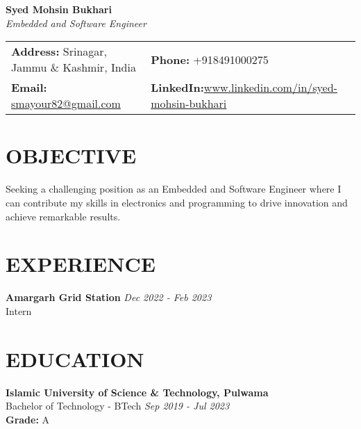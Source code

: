 \documentclass[a4paper,10pt]{article}
\begin{document}
\begin{center}
    \textbf{\Huge Syed Mohsin Bukhari} \\
    \vspace{0.5em}
    \small
    \textit{Embedded and Software Engineer} \\
    \vspace{1em}
    \begin{tabular}{p{10cm}p{6cm}}
        \textbf{Address:} Srinagar, Jammu \& Kashmir, India & \textbf{Phone:} +918491000275 \\
        \textbf{Email:} \url{smayour82@gmail.com} & \textbf{LinkedIn:}\url{www.linkedin.com/in/syed-mohsin-bukhari} \\
    \end{tabular}
\end{center}

\section{OBJECTIVE}
Seeking a challenging position as an Embedded and Software Engineer where I can contribute my skills in electronics and programming to drive innovation and achieve remarkable results.

\section{EXPERIENCE}
\textbf{Amargarh Grid Station} \hfill \textit{Dec 2022 - Feb 2023} \\
Intern

\section{EDUCATION}
\textbf{Islamic University of Science \& Technology, Pulwama} \\
Bachelor of Technology - BTech \hfill \textit{Sep 2019 - Jul 2023} \\
\textbf{Grade:} A
\end{document}
